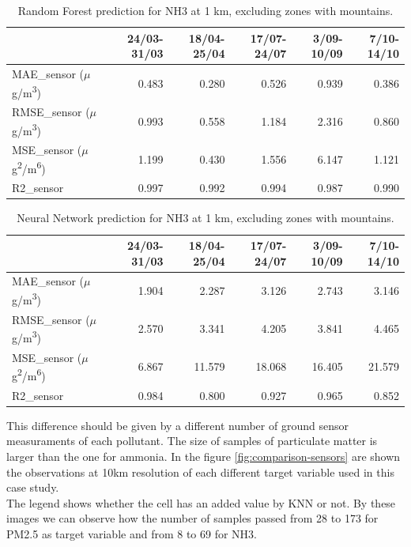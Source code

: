 \begin{table}[H]
\begin{tabular}{lrrrrr}
\toprule
  &  24/03-31/03 &  18/04-25/04 &  17/07-24/07 &  3/09-10/09 &  7/10-14/10 \\
\midrule
 MAE\_sensor ($\mu$g/m\textsuperscript{3}) &        0.483 &        0.280 &        0.526 &       0.939 &       0.386 \\
RMSE\_sensor ($\mu$g/m\textsuperscript{3}) &        0.993 &        0.558 &        1.184 &       2.316 &       0.860 \\
 MSE\_sensor ($\mu$g\textsuperscript{2}/m\textsuperscript{6}) &        1.199 &        0.430 &        1.556 &       6.147 &       1.121 \\
  R2\_sensor  &        0.997 &        0.992 &        0.994 &       0.987 &       0.990 \\
\bottomrule
\end{tabular}
\caption{Random Forest prediction for NH3 at 1 km, excluding zones with mountains.}
\label{tab:nh3RF}
\end{table}
\begin{table}[H]
\begin{tabular}{lrrrrr}
\toprule
  &  24/03-31/03 &  18/04-25/04 &  17/07-24/07 &  3/09-10/09 &  7/10-14/10 \\
\midrule
 MAE\_sensor ($\mu$g/m\textsuperscript{3})&        1.904 &        2.287 &        3.126 &       2.743 &       3.146 \\
RMSE\_sensor ($\mu$g/m\textsuperscript{3}) &        2.570 &        3.341 &        4.205 &       3.841 &       4.465 \\
 MSE\_sensor ($\mu$g\textsuperscript{2}/m\textsuperscript{6}) &        6.867 &       11.579 &       18.068 &      16.405 &      21.579 \\
  R2\_sensor &        0.984 &        0.800 &        0.927 &       0.965 &       0.852 \\
\bottomrule
\end{tabular}
\caption{Neural Network prediction for NH3 at 1 km, excluding zones with mountains.}
\label{tab:nh3NN}
\end{table}
This difference should be given by a different number of ground sensor measuraments of each pollutant. The size of samples of particulate matter is larger than the one for ammonia.
In the figure \ref{fig:comparison-sensors} are shown the observations at 10km resolution of each different target variable used in this case study. \\
The legend shows whether the cell has an added value by KNN or not. By these images we can observe how the number of samples passed from 28 to 173 for PM2.5 as target variable and from 8 to 69 for NH3.
